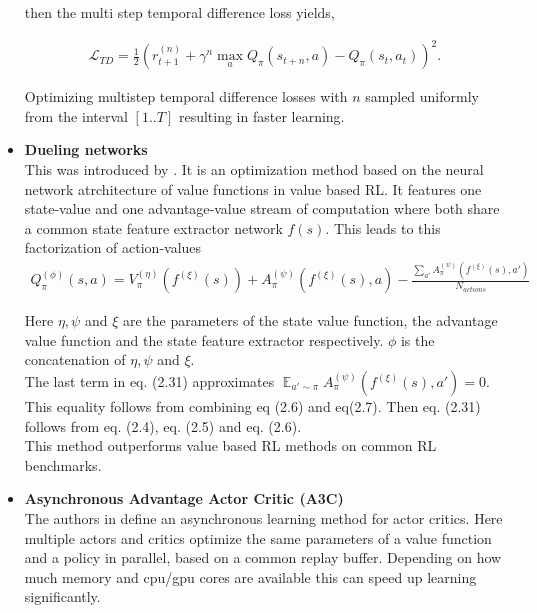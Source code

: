 \begin{itemize}
	then the multi step temporal difference loss yields,
	
	\begin{align}
		\mathcal{L}_{TD} = \frac{1}{2} \left(r_{t+1}^{(n)} + \gamma^{n} \max_{a}Q_{\pi}(s_{t+n}, a) - Q_{\pi}(s_t, a_t)\right)^2 .
	\end{align}
	
	Optimizing multistep temporal difference losses with $n$ sampled uniformly from the interval $[1..T]$ resulting in faster learning.
	
	\item \textbf{Dueling networks}\\
	This was introduced by \cite{DBLP:journals/corr/WangFL15}. It is an optimization method based on the neural network atrchitecture of value functions in value based RL. It features one state-value and one advantage-value stream of computation where both share a common state feature extractor network $f(s)$. This leads to this factorization of action-values
	\begin{align}
		Q_{\pi}^{(\phi)}(s, a) = V_{\pi}^{(\eta)}(f^{(\xi)}(s)) + A_{\pi}^{(\psi)}(f^{(\xi)}(s), a) - \frac{\sum_{a'} A_{\pi}^{(\psi)}(f^{(\xi)}(s), a')}{N_{actions}}
	\end{align}
	
	Here $\eta, \psi$ and $\xi$ are the parameters of the state value function, the advantage value function and the state feature extractor respectively. $\phi$ is the concatenation of $\eta, \psi$ and $\xi$.\\
	The last term in eq. (2.31) approximates $\mathop{\mathbb{E}}_{a' \sim \pi} A_{\pi}^{(\psi)}(f^{(\xi)}(s), a')=0$. This equality follows from combining eq (2.6) and eq(2.7). Then eq. (2.31) follows from eq. (2.4), eq. (2.5) and eq. (2.6).\\
	This method outperforms value based RL methods on common RL benchmarks. 
	
	\item \textbf{Asynchronous Advantage Actor Critic (A3C)} \label{ssec::a3c}\\
	The authors in \cite{mnih2016asynchronous} define an asynchronous learning method for actor critics. Here multiple actors and critics optimize the same parameters of a value function and a policy in parallel, based on a common replay buffer. Depending on how much memory and cpu/gpu cores are available this can speed up learning significantly.
	
\end{itemize}

